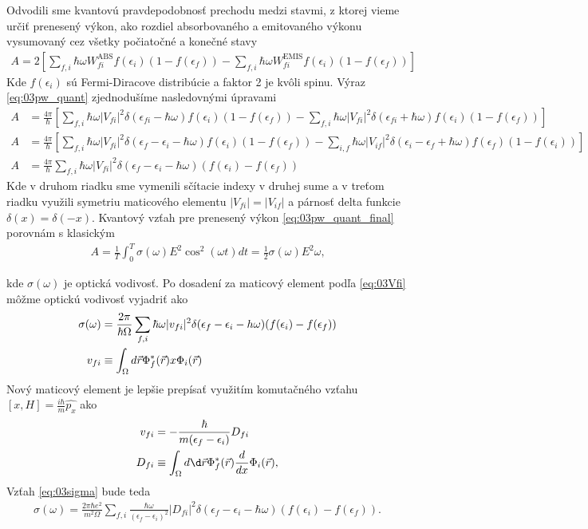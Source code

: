 Odvodili sme kvantovú pravdepodobnosť prechodu medzi stavmi, z ktorej vieme určiť prenesený výkon, ako rozdiel absorbovaného a emitovaného výkonu vysumovaný cez všetky počiatočné a konečné stavy
\begin{align}
\label{eq:03pw_quant}
A=2[\sum_{f,i}\hbar\omega W_{fi}^{\mathrm{ABS}}f(\epsilon_i)(1-f(\epsilon_f))-\sum_{f,i}\hbar\omega W_{fi}^{\mathrm{EMIS}}f(\epsilon_i)(1-f(\epsilon_f))] \
\end{align}
Kde $f(\epsilon_i)$ sú Fermi-Diracove distribúcie a faktor 2 je kvôli spinu. Výraz \eqref{eq:03pw_quant} zjednodušíme nasledovnými úpravami
\begin{align}
A&=\frac{4\pi}{\hbar}[\sum_{f,i}\hbar\omega|V_{fi}|^2\delta(\epsilon_{fi}-\hbar\omega)f(\epsilon_i)(1-f(\epsilon_f))-\sum_{f,i}\hbar\omega|V_{fi}|^2\delta(\epsilon_{fi}+\hbar\omega) f(\epsilon_i)(1-f(\epsilon_f))]\\
A&=\frac{4\pi}{\hbar}[\sum_{f,i}\hbar\omega|V_{fi}|^2\delta(\epsilon_f-\epsilon_i-\hbar\omega)f(\epsilon_i)(1-f(\epsilon_f))-\sum_{i,f}\hbar\omega|V_{if}|^2\delta(\epsilon_i-\epsilon_f+\hbar\omega) f(\epsilon_f)(1-f(\epsilon_i))]\\
\label{eq:03pw_quant_final}
A&=\frac{4\pi}{\hbar}\sum_{f,i}\hbar\omega|V_{fi}|^2\delta(\epsilon_f-\epsilon_i-\hbar\omega)(f(\epsilon_i)-f(\epsilon_f))
\end{align}
Kde v druhom riadku sme vymenili sčítacie indexy v druhej sume a v treťom riadku využili symetriu maticového elementu $|V_{fi}|=|V_{if}|$ a  párnosť delta funkcie $\delta(x)=\delta(-x)$. Kvantový vzťah pre prenesený výkon \eqref{eq:03pw_quant_final} porovnám s klasickým 
\begin{align}
A=\frac{1}{T}\int_0^T\sigma(\omega)E^2\cos^2(\omega t)dt=\frac{1}{2}\sigma(\omega)E^2\omega \text{,}
\end{align}

kde $\sigma(\omega)$ je optická vodivosť. Po dosadení za maticový element podľa \eqref{eq:03Vfi} môžme optickú vodivosť vyjadriť ako
\begin{align}
\label{eq:03sigma}
\sigma(\omega)&=\frac{2\pi}{\hbar \Omega}\sum_{f,i}\hbar\omega|v_{fi}|^2\delta(\epsilon_f-\epsilon_i-h\omega)(f(\epsilon_i)-f(\epsilon_f))\\
v_{fi}&\equiv \int_{\Omega}d\vec{r} \Phi_f^*(\vec{r})x\Phi_i(\vec{r})
\end{align}
Nový maticový element je lepšie prepísať využitím komutačného vzťahu $[x,H]=\frac{i\hbar}{m}\hat{p_x}$ ako
\begin{align}
v_{fi}&=-\frac{\hbar}{m(\epsilon_f-\epsilon_i)}D_{fi}\\
\label{eq:03matrix_element}
D_{fi}&\equiv \int_{\Omega}d\d\vr\Phi_f^*(\vr)\frac{d}{dx}\Phi_i(\vr)\text{,}
\end{align}
Vzťah \eqref{eq:03sigma} bude teda
\begin{align}
\label{eq:03sigma2}
\sigma(\omega)=\frac{2\pi\hbar e^2}{m^2\Omega} \sum_{f,i}\frac{\hbar\omega}{(\epsilon_f-\epsilon_i)^2}|D_{fi}|^2\delta(\epsilon_f-\epsilon_i-\hbar\omega)(f(\epsilon_i)-f(\epsilon_f))\text{.}
\end{align}

